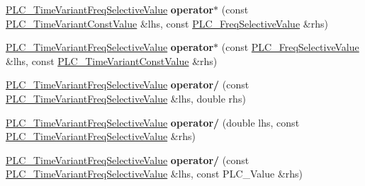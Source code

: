 \begin{DoxyCompactItemize}
\item 
\hypertarget{classns3_1_1PLC__TimeVariantFreqSelectiveValue_a98a7967618d0d619603a8af279eb8919}{\hyperlink{classns3_1_1PLC__TimeVariantFreqSelectiveValue}{\-P\-L\-C\-\_\-\-Time\-Variant\-Freq\-Selective\-Value} {\bfseries operator$\ast$} (const \hyperlink{classns3_1_1PLC__TimeVariantConstValue}{\-P\-L\-C\-\_\-\-Time\-Variant\-Const\-Value} \&lhs, const \hyperlink{classns3_1_1PLC__FreqSelectiveValue}{\-P\-L\-C\-\_\-\-Freq\-Selective\-Value} \&rhs)}\label{classns3_1_1PLC__TimeVariantFreqSelectiveValue_a98a7967618d0d619603a8af279eb8919}

\item 
\hypertarget{classns3_1_1PLC__TimeVariantFreqSelectiveValue_a94310ec03556c2390343a5e2239ca9cf}{\hyperlink{classns3_1_1PLC__TimeVariantFreqSelectiveValue}{\-P\-L\-C\-\_\-\-Time\-Variant\-Freq\-Selective\-Value} {\bfseries operator$\ast$} (const \hyperlink{classns3_1_1PLC__FreqSelectiveValue}{\-P\-L\-C\-\_\-\-Freq\-Selective\-Value} \&lhs, const \hyperlink{classns3_1_1PLC__TimeVariantConstValue}{\-P\-L\-C\-\_\-\-Time\-Variant\-Const\-Value} \&rhs)}\label{classns3_1_1PLC__TimeVariantFreqSelectiveValue_a94310ec03556c2390343a5e2239ca9cf}

\item 
\hypertarget{classns3_1_1PLC__TimeVariantFreqSelectiveValue_a22bbf304fbcddc284390b592db65ae53}{\hyperlink{classns3_1_1PLC__TimeVariantFreqSelectiveValue}{\-P\-L\-C\-\_\-\-Time\-Variant\-Freq\-Selective\-Value} {\bfseries operator/} (const \hyperlink{classns3_1_1PLC__TimeVariantFreqSelectiveValue}{\-P\-L\-C\-\_\-\-Time\-Variant\-Freq\-Selective\-Value} \&lhs, double rhs)}\label{classns3_1_1PLC__TimeVariantFreqSelectiveValue_a22bbf304fbcddc284390b592db65ae53}

\item 
\hypertarget{classns3_1_1PLC__TimeVariantFreqSelectiveValue_a082d6cd5a44f3607ca1ca913497d4143}{\hyperlink{classns3_1_1PLC__TimeVariantFreqSelectiveValue}{\-P\-L\-C\-\_\-\-Time\-Variant\-Freq\-Selective\-Value} {\bfseries operator/} (double lhs, const \hyperlink{classns3_1_1PLC__TimeVariantFreqSelectiveValue}{\-P\-L\-C\-\_\-\-Time\-Variant\-Freq\-Selective\-Value} \&rhs)}\label{classns3_1_1PLC__TimeVariantFreqSelectiveValue_a082d6cd5a44f3607ca1ca913497d4143}

\item 
\hypertarget{classns3_1_1PLC__TimeVariantFreqSelectiveValue_acb74a5078c63a7e678e136821b241f10}{\hyperlink{classns3_1_1PLC__TimeVariantFreqSelectiveValue}{\-P\-L\-C\-\_\-\-Time\-Variant\-Freq\-Selective\-Value} {\bfseries operator/} (const \hyperlink{classns3_1_1PLC__TimeVariantFreqSelectiveValue}{\-P\-L\-C\-\_\-\-Time\-Variant\-Freq\-Selective\-Value} \&lhs, const \-P\-L\-C\-\_\-\-Value \&rhs)}\label{classns3_1_1PLC__TimeVariantFreqSelectiveValue_acb74a5078c63a7e678e136821b241f10}


\end{DoxyCompactItemize}
